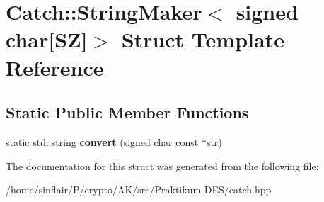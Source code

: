 \hypertarget{structCatch_1_1StringMaker_3_01signed_01char[SZ]_4}{}\section{Catch\+:\+:String\+Maker$<$ signed char\mbox{[}SZ\mbox{]}$>$ Struct Template Reference}
\label{structCatch_1_1StringMaker_3_01signed_01char[SZ]_4}
\subsection*{Static Public Member Functions}
\begin{DoxyCompactItemize}
\item 
\mbox{\label{structCatch_1_1StringMaker_3_01signed_01char[SZ]_4_a23ac689cc79dbcfe9b1765fe9e25690e}} 
static std\+::string {\bfseries convert} (signed char const $\ast$str)
\end{DoxyCompactItemize}


The documentation for this struct was generated from the following file\+:\begin{DoxyCompactItemize}
\item 
/home/sinflair/\+P/crypto/\+A\+K/src/\+Praktikum-\/\+D\+E\+S/catch.\+hpp\end{DoxyCompactItemize}
